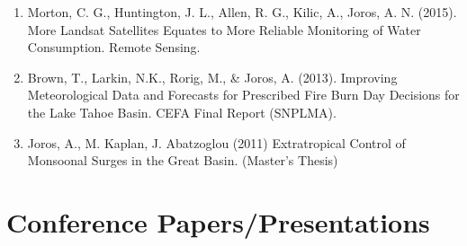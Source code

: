 \documentclass[letterpaper,11pt]{article}
\begin{document}
\begin{enumerate}[leftmargin=0.25in, label=\arabic*.]
    \item Morton, C. G., Huntington, J. L., Allen, R. G., Kilic, A., Joros, A. N. (2015). More Landsat Satellites Equates to More Reliable Monitoring of Water Consumption. Remote Sensing.
    \item Brown, T., Larkin, N.K., Rorig, M., \& Joros, A. (2013). Improving Meteorological Data and Forecasts for Prescribed Fire Burn Day Decisions for the Lake Tahoe Basin. CEFA Final Report (SNPLMA).
    \item Joros, A., M. Kaplan, J. Abatzoglou (2011) Extratropical Control of Monsoonal Surges in the Great Basin. (Master's Thesis)
 \end{enumerate}


\section{Conference Papers/Presentations}
\end{document}
